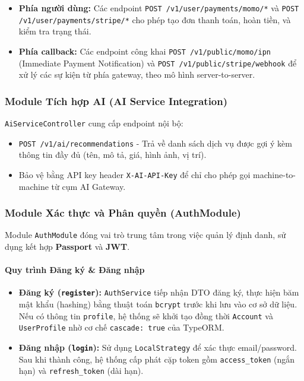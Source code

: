 \begin{itemize}
    \item \textbf{Phía người dùng:} Các endpoint \texttt{POST /v1/user/payments/momo/*} và \texttt{POST /v1/user/payments/stripe/*} cho phép tạo đơn thanh toán, hoàn tiền, và kiểm tra trạng thái.
    
    \item \textbf{Phía callback:} Các endpoint công khai \texttt{POST /v1/public/momo/ipn} (Immediate Payment Notification) và \texttt{POST /v1/public/stripe/webhook} để xử lý các sự kiện từ phía gateway, theo mô hình server-to-server.
\end{itemize}

\subsubsection{Module Tích hợp AI (AI Service Integration)}

\texttt{AiServiceController} cung cấp endpoint nội bộ:

\begin{itemize}
    \item \texttt{POST /v1/ai/recommendations} - Trả về danh sách dịch vụ được gợi ý kèm thông tin đầy đủ (tên, mô tả, giá, hình ảnh, vị trí).
    
    \item Bảo vệ bằng API key header \texttt{X-AI-API-Key} để chỉ cho phép gọi machine-to-machine từ cụm AI Gateway.
\end{itemize}

\subsubsection{Module Xác thực và Phân quyền (AuthModule)}

Module \texttt{AuthModule} đóng vai trò trung tâm trong việc quản lý định danh, sử dụng kết hợp \textbf{Passport} và \textbf{JWT}.

\paragraph{Quy trình Đăng ký \& Đăng nhập}
\begin{itemize}
    \item \textbf{Đăng ký (\texttt{register}):} \texttt{AuthService} tiếp nhận DTO đăng ký, thực hiện băm mật khẩu (hashing) bằng thuật toán \texttt{bcrypt} trước khi lưu vào cơ sở dữ liệu. Nếu có thông tin \texttt{profile}, hệ thống sẽ khởi tạo đồng thời \texttt{Account} và \texttt{UserProfile} nhờ cơ chế \texttt{cascade: true} của TypeORM.
    
    \item \textbf{Đăng nhập (\texttt{login}):} Sử dụng \texttt{LocalStrategy} để xác thực email/password. Sau khi thành công, hệ thống cấp phát cặp token gồm \texttt{access\_token} (ngắn hạn) và \texttt{refresh\_token} (dài hạn).
\end{itemize}

